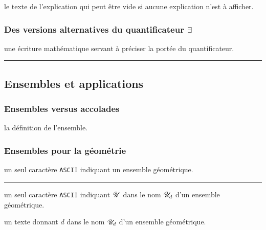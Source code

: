 \documentclass[12pt,a4paper]{article}
\theoremstyle{definition}
\newcommand\separation{
	\medskip
	\hfill\rule{0.5\textwidth}{0.75pt}\hfill
	\medskip
}
\newcommand\ascii{\texttt{ASCII}}
\begin{document}
\IDarg{} le texte de l'explication qui peut être vide si aucune explication n'est à afficher.
\subsubsection{\texorpdfstring{Des versions alternatives du quantificateur $\exists$}%
                          {Des versions alternatives du quantificateur existentiel}}



 une écriture mathématique servant à préciser la portée du quantificateur.


\separation



\subsection{Ensembles et applications}

\subsubsection{Ensembles versus accolades}



\IDarg{} la définition de l'ensemble.





\subsubsection{Ensembles pour la géométrie}


\IDarg{} un seul caractère \ascii{} indiquant un ensemble géométrique.


\separation



 un seul caractère \ascii{} indiquant $\setgeo{U}$ dans le nom $\setgeo*{U}{d}$ d'un ensemble géométrique.

 un texte donnant $d$ dans le nom $\setgeo*{U}{d}$ d'un ensemble géométrique.


\end{document}
